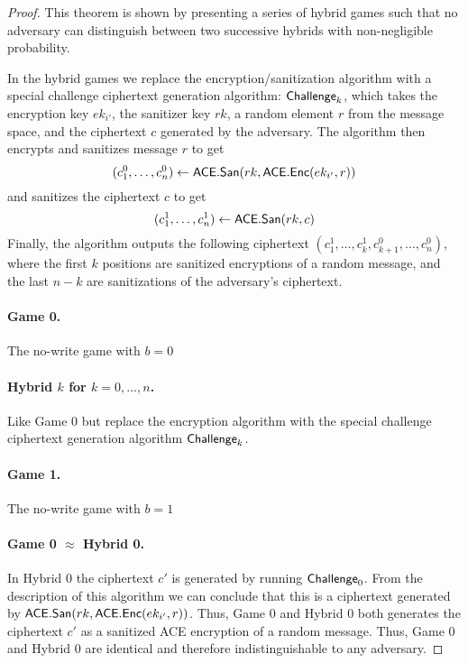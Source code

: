 \documentclass{llncs}
\begin{document}
\begin{proof}
This theorem is shown by presenting a series of hybrid games such that no adversary can distinguish between two successive hybrids with non-negligible probability.

In the hybrid games we  replace the encryption/sanitization algorithm with a special challenge ciphertext generation algorithm: $\mathsf{Challenge}_k$, which takes the encryption key $ek_{i'}$, the sanitizer key $rk$, a random element $r$ from the message space, and the ciphertext $c$ generated by the adversary. The algorithm then encrypts and sanitizes message $r$ to get 
$$(c_1^0,\dots,c_n^0) \leftarrow \mathsf{ACE}.\mathsf{San}(rk,\mathsf{ACE}.\mathsf{Enc}(ek_{i'},r))$$ 
and sanitizes the ciphertext $c$ to get 
$$(c_1^1,\dots,c_n^1) \leftarrow \mathsf{ACE}.\mathsf{San}(rk,c)$$ 
Finally, the algorithm outputs the following ciphertext $(c_1^1,\dots,c_k^1,c_{k+1}^0,\dots,c_n^0)$, where the first $k$ positions are sanitized encryptions of a random message, and the last $n-k$ are sanitizations of the adversary's ciphertext.

\paragraph{Game 0.} The no-write game with $b=0$
\paragraph{Hybrid $k$ for $k = 0,\dots,n$.} Like Game 0 but replace the encryption algorithm with the special challenge ciphertext generation algorithm $\mathsf{Challenge}_k$.
\paragraph{Game 1.} The no-write game with $b=1$

\paragraph{Game 0 $\approx$ Hybrid 0.} 
In Hybrid 0 the ciphertext $c'$ is generated by running $\mathsf{Challenge}_0$. From the description of this algorithm we can conclude that this is a ciphertext generated by $\mathsf{ACE}.\mathsf{San}(rk,\mathsf{ACE}.\mathsf{Enc}(ek_{i'},r))$. Thus, Game 0 and Hybrid 0 both generates the ciphertext $c'$ as a sanitized ACE encryption of a random message. Thus, Game 0 and Hybrid 0 are identical and therefore indistinguishable to any adversary.



\end{proof}
\end{document}
